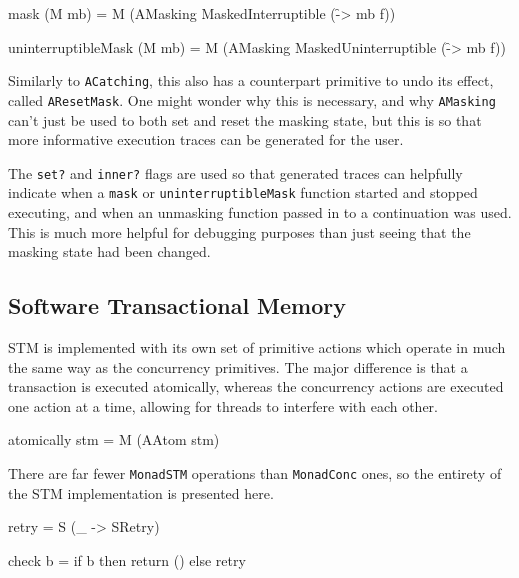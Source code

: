 \begin{haskellcode}
mask (M mb) = M
  (AMasking MaskedInterruptible (\f -> mb f))

uninterruptibleMask (M mb) = M
  (AMasking MaskedUninterruptible (\f -> mb f))
\end{haskellcode}


Similarly to \verb|ACatching|, this also has a counterpart primitive
to undo its effect, called \verb|AResetMask|. One might wonder why
this is necessary, and why \verb|AMasking| can't just be used to both
set and reset the masking state, but this is so that more informative
execution traces can be generated for the user.


The \verb|set?| and \verb|inner?| flags are used so that generated
traces can helpfully indicate when a \verb|mask| or
\verb|uninterruptibleMask| function started and stopped executing, and
when an unmasking function passed in to a continuation was used. This
is much more helpful for debugging purposes than just seeing that the
masking state had been changed.

\subsection{Software Transactional Memory}
\label{sec:execution-primops-stm}

STM is implemented with its own set of primitive actions which operate
in much the same way as the concurrency primitives. The major
difference is that a transaction is executed atomically, whereas the
concurrency actions are executed one action at a time, allowing for
threads to interfere with each other.

\begin{haskellcode}
atomically stm = M (AAtom stm)
\end{haskellcode}


There are far fewer \verb|MonadSTM| operations than \verb|MonadConc|
ones, so the entirety of the STM implementation is presented here.

\begin{haskellcode}
retry = S (\_ -> SRetry)

check b = if b then return () else retry
\end{haskellcode}

